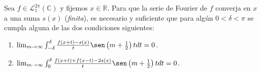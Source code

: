 \documentclass[12pt]{report}
\theoremstyle{largebreak}
\begin{document}
    \begin{theor}
        Sea $f\in\mathcal{L}_1^{2\pi}(\mathbb{C})$ y fijemos $x\in\mathbb{R}$. Para que la serie de Fourier de $f$ converja en $x$ a una suma $s(x)$ (\textit{finita}), es necesario y suficiente que para algún $0<\delta<\pi$ se cumpla alguna de las dos condiciones siguientes:
        \begin{enumerate}
            \item $\lim_{ m\rightarrow\infty}\int_{-\delta}^\delta \frac{f(x+t)-s(x)}{t}\sen\left(m+\frac{1}{2} \right)tdt=0$.
            \item $\lim_{ m\rightarrow\infty}\int_{0}^\delta \frac{f(x+t)+f(x-t)-2s(x)}{t}\sen\left(m+\frac{1}{2} \right)tdt=0$.
        \end{enumerate}
    \end{theor}
\end{document}
